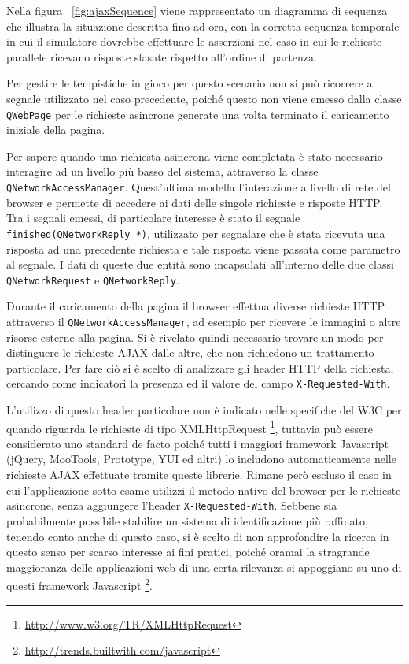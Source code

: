 Nella figura ~\ref{fig:ajaxSequence} viene rappresentato un diagramma di sequenza che illustra la situazione descritta fino ad ora, con la corretta sequenza temporale in cui il simulatore dovrebbe effettuare le asserzioni nel caso in cui le richieste parallele ricevano risposte sfasate rispetto all'ordine di partenza.  

Per gestire le tempistiche in gioco per questo scenario non si può ricorrere al segnale utilizzato nel caso precedente, poiché questo non viene emesso dalla classe \verb|QWebPage| per le richieste asincrone generate una volta terminato il caricamento iniziale della pagina.

Per sapere quando una richiesta asincrona viene completata è stato necessario interagire ad un livello più basso del sistema, attraverso la classe \verb|QNetworkAccessManager|. Quest'ultima modella l'interazione a livello di rete del browser e permette di accedere ai dati delle singole richieste e risposte HTTP. Tra i segnali emessi, di particolare interesse è stato il segnale \verb|finished(QNetworkReply *)|, utilizzato per segnalare che è stata ricevuta una risposta ad una precedente richiesta e tale risposta viene passata come parametro al segnale. I dati di queste due entità sono incapsulati all'interno delle due classi \verb|QNetworkRequest| e \verb|QNetworkReply|.

Durante il caricamento della pagina il browser effettua diverse richieste HTTP attraverso il \verb|QNetworkAccessManager|, ad esempio per ricevere le immagini o altre risorse esterne alla pagina. Si è rivelato quindi necessario trovare un modo per distinguere le richieste AJAX dalle altre, che non richiedono un trattamento particolare. Per fare ciò si è scelto di analizzare gli header HTTP della richiesta, cercando come indicatori la presenza ed il valore del campo \verb|X-Requested-With|.

L'utilizzo di questo header particolare non è indicato nelle specifiche del W3C per quando riguarda le richieste di tipo XMLHttpRequest \footnote{\url{http://www.w3.org/TR/XMLHttpRequest}}, tuttavia può essere considerato uno standard de facto poiché tutti i maggiori framework Javascript (jQuery, MooTools, Prototype, YUI ed altri) lo includono automaticamente nelle richieste AJAX effettuate tramite queste librerie. Rimane però escluso il caso in cui l'applicazione sotto esame utilizzi il metodo nativo del browser per le richieste asincrone, senza aggiungere l'header \verb|X-Requested-With|. Sebbene sia probabilmente possibile stabilire un sistema di identificazione più raffinato, tenendo conto anche di questo caso, si è scelto di non approfondire la ricerca in questo senso per scarso interesse ai fini pratici, poiché oramai la stragrande maggioranza delle applicazioni web di una certa rilevanza si appoggiano su uno di questi framework Javascript \footnote{\url{http://trends.builtwith.com/javascript}}.

